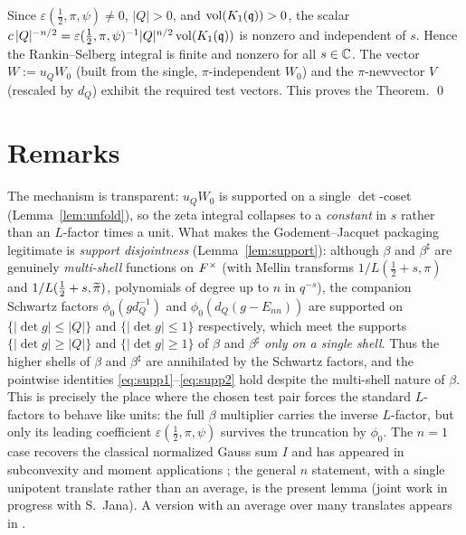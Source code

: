 Since $\varepsilon(\tfrac12,\pi,\psi)\neq0$, $|Q|>0$, and $\operatorname{vol}(K_1(\mathfrak{q}))>0$, the scalar
$c\,|Q|^{-n/2}=\varepsilon(\tfrac12,\pi,\psi)^{-1}|Q|^{n/2}\operatorname{vol}(K_1(\mathfrak{q}))$ is nonzero and
independent of $s$. Hence the Rankin--Selberg integral is finite and nonzero for all $s\in\mathbb{C}$.
The vector $W:=u_Q W_0$ (built from the single, $\pi$-independent $W_0$) and the $\pi$-newvector
$V$ (rescaled by $d_Q$) exhibit the required test vectors. This proves the Theorem. \qed

\section*{Remarks}

The mechanism is transparent: $u_Q W_0$ is supported on a single $\det$-coset
(Lemma~\ref{lem:unfold}), so the zeta integral collapses to a \emph{constant} in $s$ rather than an
$L$-factor times a unit. What makes the Godement--Jacquet packaging legitimate is
\emph{support disjointness} (Lemma~\ref{lem:support}): although $\beta$ and $\beta^\sharp$ are
genuinely \emph{multi-shell} functions on $F^\times$ (with Mellin transforms $1/L(\tfrac12+s,\pi)$
and $1/L(\tfrac12+s,\widetilde{\pi})$, polynomials of degree up to $n$ in $q^{-s}$), the companion
Schwartz factors $\phi_0(g d_Q^{-1})$ and $\phi_0(d_Q(g-E_{nn}))$ are supported on
$\{|\det g|\le|Q|\}$ and $\{|\det g|\le1\}$ respectively, which meet the supports
$\{|\det g|\ge|Q|\}$ and $\{|\det g|\ge1\}$ of $\beta$ and $\beta^\sharp$ \emph{only on a single shell}.
Thus the higher shells of $\beta$ and $\beta^\sharp$ are annihilated by the Schwartz factors, and the
pointwise identities \eqref{eq:supp1}--\eqref{eq:supp2} hold despite the multi-shell nature of $\beta$.
This is precisely the place where the chosen test pair forces the standard $L$-factors to behave like
units: the full $\beta$ multiplier carries the inverse $L$-factor, but only its leading coefficient
$\varepsilon(\tfrac12,\pi,\psi)$ survives the truncation by $\phi_0$. The $n=1$ case recovers the
classical normalized Gauss sum $I$ and has appeared in subconvexity and moment applications
\cite{Sarnak,MV}; the general $n$ statement, with a single unipotent translate rather than an
average, is the present lemma (joint work in progress with S.~Jana). A version with an average over
many translates appears in \cite{BKL}.

